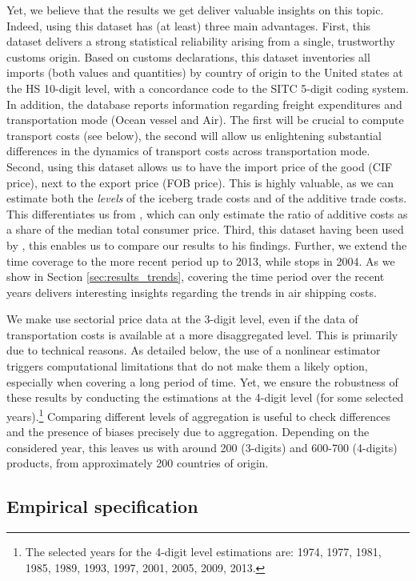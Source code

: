 \documentclass[a4paper,11pt]{article}
\begin{document}
Yet, we believe that the results we get deliver valuable insights on this topic. Indeed, using this dataset has (at least) three main advantages. First, this dataset delivers a strong statistical reliability arising from a single, trustworthy customs origin. Based on customs declarations, this dataset inventories all imports (both values and quantities) by country of origin to the United states at the HS 10-digit level, with a concordance code to the SITC 5-digit coding system. In addition, the database reports information regarding freight expenditures and transportation mode (Ocean vessel and Air). The first will be crucial to compute transport costs (see below), the second will allow us enlightening substantial differences in the dynamics of transport costs across transportation mode. Second, using this dataset allows us to have the import price of the good (CIF price), next to the export price (FOB price). This is highly valuable, as we can estimate both the \textit{levels} of the iceberg trade costs and of the additive trade costs. This differentiates us from \citet{Irrazabal_2015}, which can only estimate the ratio of additive costs as a share of the median total consumer price. Third, this dataset having been used by \cite{hummels2007}, this enables us to compare our results to his findings. Further, we extend the time coverage to the more recent period up to 2013, while \cite{hummels2007} stops in 2004. As we show in Section \ref{sec:results_trends}, covering the time period over the recent years delivers interesting insights regarding the trends in air shipping costs.

We make use sectorial price data at the 3-digit level, even if the data of transportation costs is available at a more disaggregated level. This is primarily due to technical reasons. As detailed below, the use of a nonlinear estimator triggers computational limitations that do not make them a likely option, especially when covering a long period of time. Yet, we ensure the robustness of these results by conducting the estimations at the 4-digit level (for some selected years).\footnote{The selected years for the 4-digit level estimations are: 1974, 1977, 1981, 1985, 1989, 1993, 1997, 2001, 2005, 2009, 2013.} Comparing different levels of aggregation is useful to check differences and the presence of biases precisely due to aggregation. Depending on the considered year, this leaves us with around 200 (3-digits) and 600-700 (4-digits) products, from approximately 200 countries of origin.


\subsection{Empirical specification}
\end{document}
